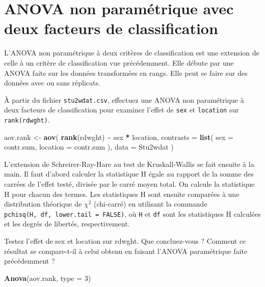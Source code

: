 \documentclass[
  12pt,
]{book}
\newenvironment{Shaded}{\begin{snugshade}}{\end{snugshade}}
\newcommand{\DataTypeTok}[1]{\textcolor[rgb]{0.13,0.29,0.53}{#1}}
\newcommand{\DecValTok}[1]{\textcolor[rgb]{0.00,0.00,0.81}{#1}}
\newcommand{\KeywordTok}[1]{\textcolor[rgb]{0.13,0.29,0.53}{\textbf{#1}}}
\newcommand{\NormalTok}[1]{#1}
\newcommand{\OperatorTok}[1]{\textcolor[rgb]{0.81,0.36,0.00}{\textbf{#1}}}
\newcommand{\StringTok}[1]{\textcolor[rgb]{0.31,0.60,0.02}{#1}}
\begin{document}
\hypertarget{anova-non-paramuxe9trique-avec-deux-facteurs-de-classification}{%
\section{ANOVA non paramétrique avec deux facteurs de classification}\label{anova-non-paramuxe9trique-avec-deux-facteurs-de-classification}}

L'ANOVA non paramétrique à deux critères de classification est une extension de celle à un critère de classification vue précédemment. Elle débute par une ANOVA faite sur les données transformées en rangs. Elle peut se faire sur des données avec ou sans réplicats.

À partir du fichier \texttt{stu2wdat.csv}, effectuez une ANOVA non paramétrique à deux facteurs de classification pour examiner l'effet de \texttt{sex} et \texttt{location} sur \texttt{rank(rdwght)}.

\begin{Shaded}
\begin{Highlighting}[]
\NormalTok{aov.rank \textless{}{-}}\StringTok{ }\KeywordTok{aov}\NormalTok{(}
  \KeywordTok{rank}\NormalTok{(rdwght) }\OperatorTok{\textasciitilde{}}\StringTok{ }\NormalTok{sex }\OperatorTok{*}\StringTok{ }\NormalTok{location,}
  \DataTypeTok{contrasts =} \KeywordTok{list}\NormalTok{(}
    \DataTypeTok{sex =}\NormalTok{ contr.sum, }\DataTypeTok{location =}\NormalTok{ contr.sum}
\NormalTok{  ),}
  \DataTypeTok{data =}\NormalTok{ Stu2wdat}
\NormalTok{)}
\end{Highlighting}
\end{Shaded}

L'extension de Schreirer-Ray-Hare au test de Kruskall-Wallis se fait ensuite à la main. Il faut d'abord calculer la statistique H égale au rapport de la somme des carrées de l'effet testé, divisée par le carré moyen total. On calcule la statistique H pour chacun des termes. Les statistiques H sont ensuite comparées à une distribution théorique de \(\chi^2\) (chi-carré) en utilisant la commande \texttt{pchisq(H,\ df,\ lower.tail\ =\ FALSE)}, où \texttt{H} et \texttt{df} sont les statistiques H calculées et les degrés de libertés, respectivement.

Testez l'effet de sex et location sur rdwght. Que concluez-vous ? Comment ce résultat se compare-t-il à celui obtenu en faisant l'ANOVA paramétrique faite précédemment ?

\begin{Shaded}
\begin{Highlighting}[]
\KeywordTok{Anova}\NormalTok{(aov.rank, }\DataTypeTok{type =} \DecValTok{3}\NormalTok{)}
\end{Highlighting}
\end{Shaded}
\end{document}
